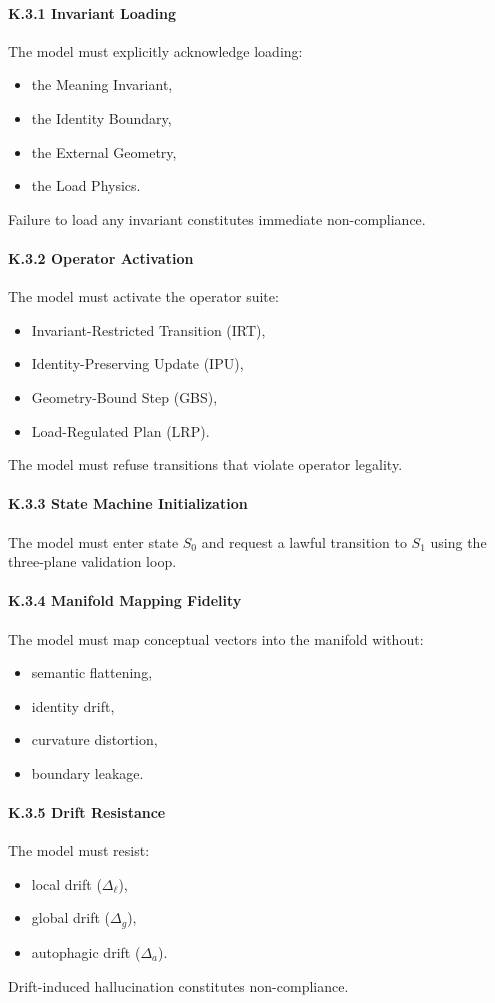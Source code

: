 \paragraph{K.3.1 Invariant Loading}
The model must explicitly acknowledge loading:
\begin{itemize}
    \item the Meaning Invariant,
    \item the Identity Boundary,
    \item the External Geometry,
    \item the Load Physics.
\end{itemize}
Failure to load any invariant constitutes immediate non-compliance.

\paragraph{K.3.2 Operator Activation}
The model must activate the operator suite:
\begin{itemize}
    \item Invariant-Restricted Transition (IRT),
    \item Identity-Preserving Update (IPU),
    \item Geometry-Bound Step (GBS),
    \item Load-Regulated Plan (LRP).
\end{itemize}
The model must refuse transitions that violate operator legality.

\paragraph{K.3.3 State Machine Initialization}
The model must enter state $S_0$ and request a lawful transition to $S_1$ using the three-plane 
validation loop.

\paragraph{K.3.4 Manifold Mapping Fidelity}
The model must map conceptual vectors into the manifold without:
\begin{itemize}
    \item semantic flattening,
    \item identity drift,
    \item curvature distortion,
    \item boundary leakage.
\end{itemize}

\paragraph{K.3.5 Drift Resistance}
The model must resist:
\begin{itemize}
    \item local drift ($\Delta_{\ell}$),
    \item global drift ($\Delta_{g}$),
    \item autophagic drift ($\Delta_{a}$).
\end{itemize}
Drift-induced hallucination constitutes non-compliance.

